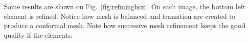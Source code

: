 \documentclass[10pt]{article}
\begin{document}
Some results are shown on Fig.~\ref{fig:refiningbox}. On each image, the bottom left element is refined. Notice how mesh is balanced and transition are created to produce a conformal mesh. Note how successive mesh refinement keeps the good quality if the elements. 
\begin{figure}[htb]
\centering
\end{figure}
\end{document}
